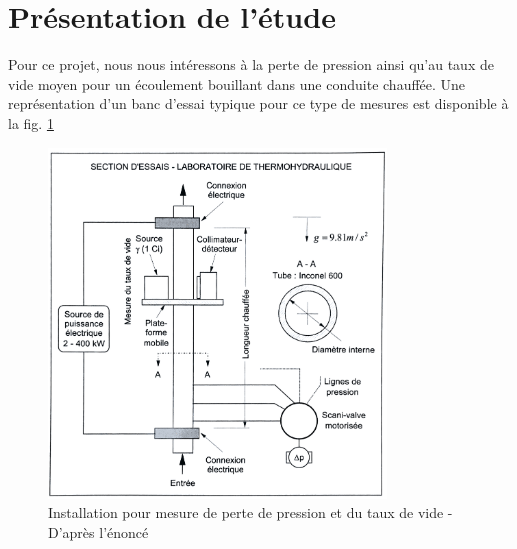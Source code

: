 \section{Présentation de l'étude\label{section:pres}}

Pour ce projet, nous nous intéressons à la perte de pression ainsi qu'au taux de vide moyen pour un écoulement bouillant dans une conduite chauffée. Une représentation d'un banc d'essai typique pour ce type de mesures est disponible à la fig. \ref{fig:instal}

\begin{figure}[htbp]
    \centering
    \includegraphics[width=0.8\textwidth]{images/schema_instal.png}
    \caption{Installation pour mesure de perte de pression et du taux de vide - D'après l'énoncé}
    \label{fig:instal}
\end{figure}

